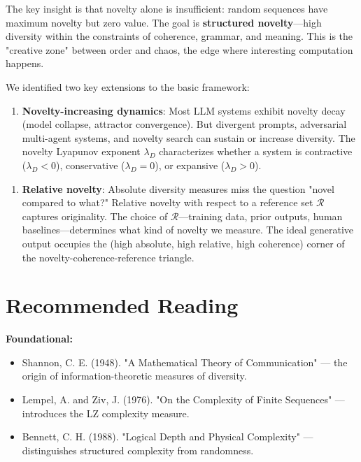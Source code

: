 The key insight is that novelty alone is insufficient: random sequences have maximum novelty but zero value. The goal is \textbf{structured novelty}---high diversity within the constraints of coherence, grammar, and meaning. This is the "creative zone" between order and chaos, the edge where interesting computation happens.

We identified two key extensions to the basic framework:

\begin{enumerate}
\item \textbf{Novelty-increasing dynamics}: Most LLM systems exhibit novelty decay (model collapse, attractor convergence). But divergent prompts, adversarial multi-agent systems, and novelty search can sustain or increase diversity. The novelty Lyapunov exponent $\lambda_D$ characterizes whether a system is contractive ($\lambda_D < 0$), conservative ($\lambda_D = 0$), or expansive ($\lambda_D > 0$).
\end{enumerate}

\begin{enumerate}
\item \textbf{Relative novelty}: Absolute diversity measures miss the question "novel compared to what?" Relative novelty with respect to a reference set $\mathcal{R}$ captures originality. The choice of $\mathcal{R}$---training data, prior outputs, human baselines---determines what kind of novelty we measure. The ideal generative output occupies the (high absolute, high relative, high coherence) corner of the novelty-coherence-reference triangle.
\end{enumerate}



\section{Recommended Reading}

\textbf{Foundational:}
\begin{itemize}
\item Shannon, C. E. (1948). "A Mathematical Theory of Communication" --- the origin of information-theoretic measures of diversity.
\item Lempel, A. and Ziv, J. (1976). "On the Complexity of Finite Sequences" --- introduces the LZ complexity measure.
\item Bennett, C. H. (1988). "Logical Depth and Physical Complexity" --- distinguishes structured complexity from randomness.
\end{itemize}

